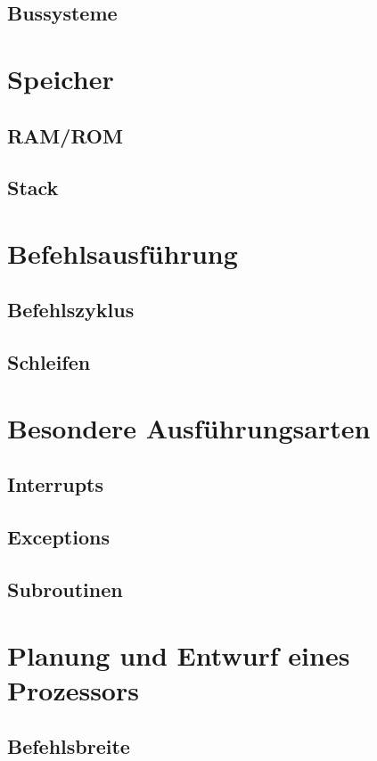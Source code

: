 \documentclass[12pt]{article}
\begin{document}
\subsection{Bussysteme}

\section{Speicher}
\subsection{RAM/ROM}
\subsection{Stack}

\section{Befehlsausführung}
\subsection{Befehlszyklus}
\subsection{Schleifen}

\section{Besondere Ausführungsarten}
\subsection{Interrupts}
\subsection{Exceptions}
\subsection{Subroutinen}



\section{Planung und Entwurf eines Prozessors}
\subsection{Befehlsbreite}
\end{document}
